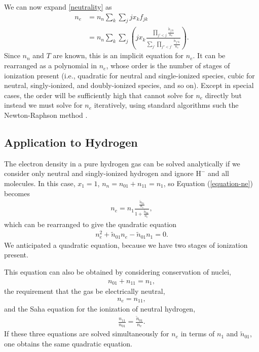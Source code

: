 We can now expand \eqref{neutrality} as
\begin{align}
n_e &= n_n \sum_{k} \sum_{j} j x_k f_{jk}\\
&= n_n \sum_{k} \sum_{j}
\left(
j x_k 
\frac{\prod_{j' < j} 
\frac{\tilde n_{j'k}}{n_e}}{\sum_{j'}\prod_{j'' < j'} \frac{\tilde n_{j''
k}}{n_e}}
\right).
\label{equation-ne}
\end{align}
Since $n_n$ and $T$ are known, this is an implicit equation for $n_e$.
It can be rearranged as a polynomial in $n_e$, whose order is the number of stages of ionization present (i.e., quadratic for neutral and single-ionized species, cubic for neutral, singly-ionized, and doubly-ionized species, and so on).
Except in special cases, the order will be sufficiently high that cannot solve for $n_e$ directly but
instead we must solve for $n_e$ iteratively, using standard algorithms
such the Newton-Raphson method \cite[chapter 10]{Press-1992}.

\newslide

\subsection{Application to Hydrogen}

The electron density in a pure hydrogen gas can be solved analytically
if we consider only neutral and singly-ionized hydrogen and ignore
$\mathrm{H}^-$ and all molecules. In this case, $x_1 = 1$, $n_n = n_{01}
+ n_{11} = n_1$, so Equation (\ref{equation-ne}) becomes 
\begin{align}
n_e = n_1 \frac{\frac{\tilde n_{01}}{n_e}}{1 + \frac{\tilde
n_{01}}{n_e}},
\end{align}
which can be rearranged to give the quadratic equation
\begin{align}
n_e^2 + \tilde n_{01} n_e - \tilde n_{01} n_1 = 0.
\end{align}
We anticipated a quadratic equation, because we have two stages of ionization present. 

This equation can also be obtained by considering conservation of nuclei,
\begin{align}
n_{01} + n_{11} = n_1,
\end{align}
the requirement that the gas be electrically neutral,
\begin{align}
n_e = n_{11},
\end{align}
and the Saha equation for the ionization of neutral hydrogen,
\begin{align}
\frac{n_{11}}{n_{01}} = \frac{\tilde n_{01}}{n_e}.
\end{align}
If these three equations are solved simultaneously for $n_e$ in terms of $n_1$ and $\tilde n_{01}$, one obtains the same quadratic equation.


